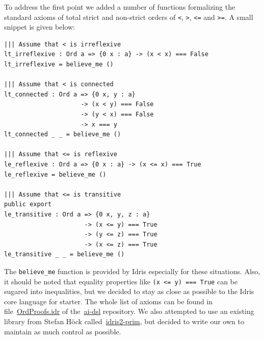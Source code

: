 \documentclass[]{report}
\begin{document}
To address the first point we added a number of functions formalizing
the standard axioms of total strict and non-strict orders of
\texttt{<}, \texttt{>}, \texttt{<=} and \texttt{>=}.  A small snippet
is given below:
\begin{verbatim}
||| Assume that < is irreflexive
lt_irreflexive : Ord a => {0 x : a} -> (x < x) === False
lt_irreflexive = believe_me ()

||| Assume that < is connected
lt_connected : Ord a => {0 x, y : a}
                     -> (x < y) === False
                     -> (y < x) === False
                     -> x === y
lt_connected _ _ = believe_me ()

||| Assume that <= is reflexive
le_reflexive : Ord a => {0 x : a} -> (x <= x) === True
le_reflexive = believe_me ()

||| Assume that <= is transitive
public export
le_transitive : Ord a => {0 x, y, z : a}
                      -> (x <= y) === True
                      -> (y <= z) === True
                      -> (x <= z) === True
le_transitive _ _ = believe_me ()
\end{verbatim}
The \texttt{believe\_me} function is provided by Idris especially for
these situations.  Also, it should be noted that equality properties
like \texttt{(x <= y) === True} can be sugared into inequalities, but
we decided to stay as close as possible to the Idris core language for
starter.  The whole list of axioms can be found in
file~\href{https://github.com/singnet/ai-dsl/blob/master/experimental/ai-algorithms/descent/Search/OrdProofs.idr}{OrdProofs.idr}
of the~\href{https://github.com/singnet/ai-dsl}{ai-dsl} repository.
We also attempted to use an existing library from Stefan H\"ock
called~\href{https://github.com/stefan-hoeck/idris2-prim}{idris2-prim},
but decided to write our own to maintain as much control as possible.\\
\end{document}
